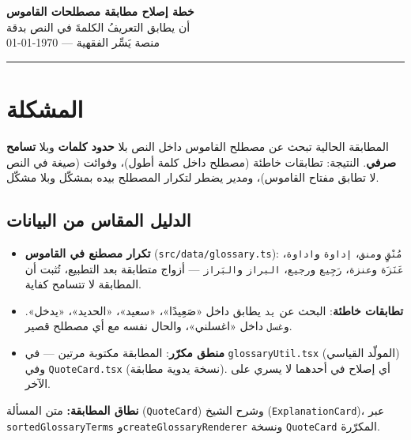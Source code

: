 \documentclass[11pt]{article}
\begin{document}
\begin{center}
  {\Huge\bfseries\color{gold} خطة إصلاح مطابقة مصطلحات القاموس}\\[4pt]
  {\large\color{darkbg} أن يطابق التعريفُ الكلمةَ في النص بدقة}\\[6pt]
  {\small\color{midgray} منصة يَسِّر الفقهية — \today}
\end{center}

\vspace{4pt}
\hrule
\vspace{10pt}

\section{المشكلة}

\begin{goalbox}
المطابقة الحالية تبحث عن مصطلح القاموس داخل النص بلا \textbf{حدود كلمات} وبلا \textbf{تسامح صرفي}.
النتيجة: تطابقات خاطئة (مصطلح داخل كلمة أطول)، وفوائت (صيغة في النص لا تطابق مفتاح القاموس)،
ومدير يضطر لتكرار المصطلح بيده بمشكّل وبلا مشكّل.
\end{goalbox}

\subsection*{الدليل المقاس من البيانات}
\begin{itemize}
  \item \textbf{تكرار مصطنع في القاموس} (\texttt{src/data/glossary.ts}): \texttt{مُنْقٍ} و\texttt{منق}،
        \texttt{إداوة} و\texttt{اداوة}، \texttt{عَنَزَة} و\texttt{عنزة}، \texttt{رَجِيع} و\texttt{رجيع}،
        \texttt{البراز} و\texttt{البَراز} — أزواج متطابقة بعد التطبيع، تُثبت أن المطابقة لا تتسامح كفاية.
  \item \textbf{تطابقات خاطئة}: البحث عن \texttt{يد} يطابق داخل «صَعِيدًا»، «سعيد»، «الحديد»، «يدخل».
        و\texttt{غسل} داخل «اغسلني»، والحال نفسه مع أي مصطلح قصير.
  \item \textbf{منطق مكرّر}: المطابقة مكتوبة مرتين — في \texttt{glossaryUtil.tsx} (المولّد القياسي)
        وفي \texttt{QuoteCard.tsx} (نسخة يدوية مطابقة). أي إصلاح في أحدهما لا يسري على الآخر.
\end{itemize}

\begin{notebox}
\textbf{نطاق المطابقة:} متن المسألة (\texttt{QuoteCard}) وشرح الشيخ (\texttt{ExplanationCard})،
عبر \texttt{sortedGlossaryTerms} و\texttt{createGlossaryRenderer} ونسخة \texttt{QuoteCard} المكرّرة.
\end{notebox}
\end{document}
